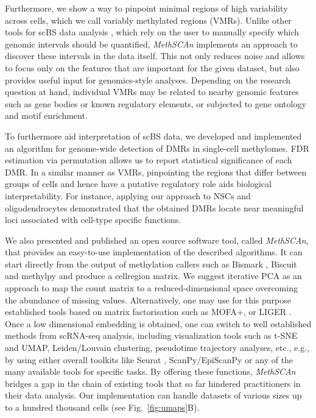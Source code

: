 \documentclass[twocolumn,10pt]{article}
\newcommand{\new}[1]{#1} %
\begin{document}
Furthermore, we show a way to pinpoint minimal regions of high variability across cells, which we call variably methylated regions (VMRs).
\new{Unlike other tools for scBS data analysis \citep{kapourani2019melissa, kapourani2021scmet, danese2021episcanpy}, which rely on the user to manually specify which genomic intervals should be quantified, \textit{MethSCAn} implements an approach to discover these intervals in the data itself. This not only reduces noise and allows to focus only on the features that are important for the given dataset, but also provides useful input for genomics-style analyses.
Depending on the research question at hand, individual VMRs may be related to nearby genomic features such as gene bodies or known regulatory elements, or subjected to gene ontology and motif enrichment.}

\new{To furthermore aid interpretation of scBS data, we developed and implemented an algorithm for genome-wide detection of DMRs in single-cell methylomes.}
FDR estimation via permutation allows us to report statistical significance of each DMR.
\new{In a similar manner as VMRs, pinpointing the regions that differ between groups of cells and hence have a putative regulatory role aids biological interpretability.}
\new{For instance,} applying our approach to NSCs and oligodendrocytes demonstrated that the obtained DMRs locate near meaningful loci associated with cell-type specific functions.


We also presented and published an open source software tool, called \textit{MethSCAn}, that provides an easy-to-use implementation of the described algorithms.
\new{It can start directly from the output of methylation callers such as Bismark \citep{bismark}, Biscuit \citep{biscuit} and methylpy \citep{methylpy} and produce a cell\texttimes region matrix.
We suggest iterative PCA as an approach to map the count matrix to a reduced-dimensional space overcoming the abundance of missing values.
Alternatively, one may use for this purpose established tools based on matrix factorisation such as MOFA+, \citep[][included in our benchmarks]{argelaguet2020mofa} or LIGER \citep{welch2019single}.
Once a low dimensional embedding is obtained, one can switch to well established methods from scRNA-seq analysis, including visualization tools such as t-SNE and UMAP, Leiden/Louvain clustering, pseudotime trajectory analyses, etc., e.g., by using either overall toolkits like Seurat \citep{seurat5}, ScanPy/EpiScanPy \citep{Wolf_2018,danese2021episcanpy} or any of the many available tools for specific tasks.
By offering these functions, \textit{MethSCAn} bridges a gap in the chain of existing tools that so far hindered practitioners in their data analysis.
Our implementation can handle datasets of various sizes up to a hundred thousand cells (see Fig.~\ref{fig:umaps}B).}
\end{document}
